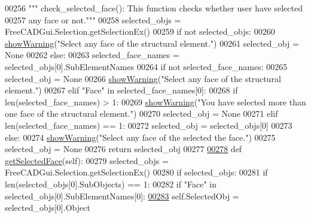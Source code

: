 \begin{DoxyCode}
00256     \textcolor{stringliteral}{""" check\_selected\_face(): This function checks whether user have selected}
00257 \textcolor{stringliteral}{        any face or not."""}
00258     selected\_objs = FreeCADGui.Selection.getSelectionEx()
00259     \textcolor{keywordflow}{if} \textcolor{keywordflow}{not} selected\_objs:
00260         \hyperlink{namespaceRebarfunc_a2278a0602d46a62953af1fcf2e574a94}{showWarning}(\textcolor{stringliteral}{"Select any face of the structural element."})
00261         selected\_obj = \textcolor{keywordtype}{None}
00262     \textcolor{keywordflow}{else}:
00263         selected\_face\_names = selected\_objs[0].SubElementNames
00264         \textcolor{keywordflow}{if} \textcolor{keywordflow}{not} selected\_face\_names:
00265             selected\_obj = \textcolor{keywordtype}{None}
00266             \hyperlink{namespaceRebarfunc_a2278a0602d46a62953af1fcf2e574a94}{showWarning}(\textcolor{stringliteral}{"Select any face of the structural element."})
00267         \textcolor{keywordflow}{elif} \textcolor{stringliteral}{"Face"} \textcolor{keywordflow}{in} selected\_face\_names[0]:
00268             \textcolor{keywordflow}{if} len(selected\_face\_names) > 1:
00269                 \hyperlink{namespaceRebarfunc_a2278a0602d46a62953af1fcf2e574a94}{showWarning}(\textcolor{stringliteral}{"You have selected more than one face of the structural element."})
00270                 selected\_obj = \textcolor{keywordtype}{None}
00271             \textcolor{keywordflow}{elif} len(selected\_face\_names) == 1:
00272                 selected\_obj = selected\_objs[0]
00273         \textcolor{keywordflow}{else}:
00274             \hyperlink{namespaceRebarfunc_a2278a0602d46a62953af1fcf2e574a94}{showWarning}(\textcolor{stringliteral}{"Select any face of the selected the face."})
00275             selected\_obj = \textcolor{keywordtype}{None}
00276     \textcolor{keywordflow}{return} selected\_obj
00277 
\hypertarget{Rebarfunc_8py_source.tex_l00278}{}\hyperlink{namespaceRebarfunc_a8c003df49ac5f249bd9ea4acfb7d2f8d}{00278} \textcolor{keyword}{def }\hyperlink{namespaceRebarfunc_a8c003df49ac5f249bd9ea4acfb7d2f8d}{getSelectedFace}(self):
00279     selected\_objs = FreeCADGui.Selection.getSelectionEx()
00280     \textcolor{keywordflow}{if} selected\_objs:
00281         \textcolor{keywordflow}{if} len(selected\_objs[0].SubObjects) == 1:
00282             \textcolor{keywordflow}{if} \textcolor{stringliteral}{"Face"} \textcolor{keywordflow}{in} selected\_objs[0].SubElementNames[0]:
\hypertarget{Rebarfunc_8py_source.tex_l00283}{}\hyperlink{namespaceRebarfunc_aca3582a1ad0a9350ca59d02fd3188f80}{00283}                 self.SelectedObj = selected\_objs[0].Object

\end{DoxyCode}
